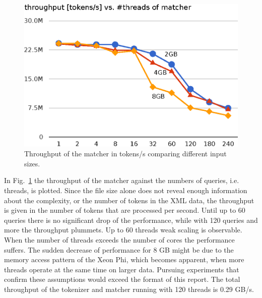 \begin{figure}\centering
  \includegraphics[scale=.75]{img/matcher_throughput_2.eps}
  \caption{Throughput of the matcher in tokens/s comparing different input sizes. \label{matcher_throughput}}
\end{figure}
In Fig.~\ref{matcher_throughput} the throughput of the matcher against the numbers of queries, i.e. threads, is plotted. Since the file size alone does not reveal enough information about the complexity, or the number of tokens in the XML data, the throughput is given in the number of tokens that are processed per second. Until up to 60 queries there is no significant drop of the performance, while with 120 queries and more the throughput plummets. Up to 60 threads weak scaling is observable. When the number of threads exceeds the number of cores the performance suffers. The sudden decrease of performance for 8 GB might be due to the memory access pattern of the Xeon Phi, which becomes apparent, when more threads operate at the same time on larger data. Pursuing experiments that confirm these assumptions would exceed the format of this report. The total throughput of the tokenizer and matcher running with 120 threads is 0.29 GB/s.